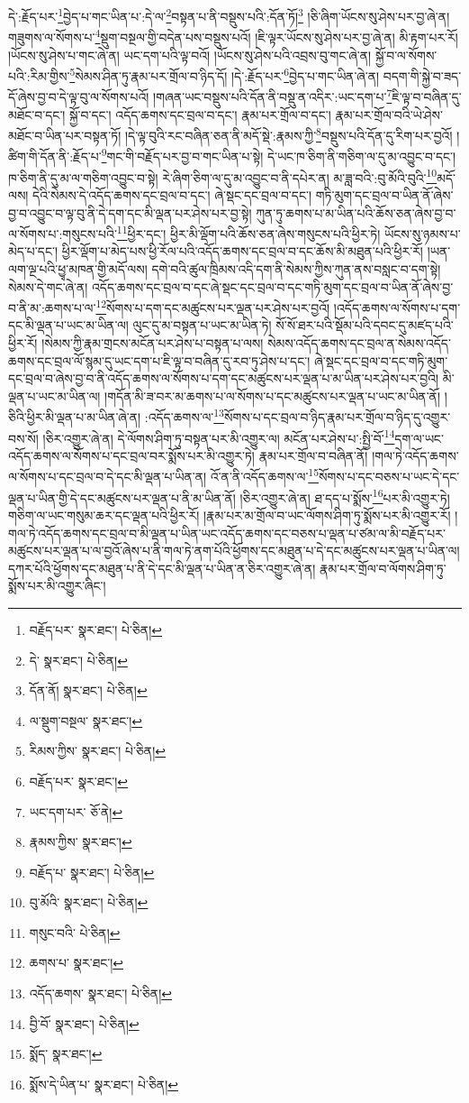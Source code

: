 དེ་:རྗོད་པར་\footnote{བརྗོད་པར་  སྣར་ཐང་།  པེ་ཅིན། }བྱེད་པ་གང་ཡིན་པ་:དེ་ལ་\footnote{དེ་  སྣར་ཐང་།  པེ་ཅིན། }བསྟན་པ་ནི་བསྡུས་པའི་:དོན་ཏོ།\footnote{དོན་ནོ།  སྣར་ཐང་།  པེ་ཅིན། } །ཅི་ཞིག་ཡོངས་སུ་ཤེས་པར་བྱ་ཞེ་ན། གཟུགས་ལ་སོགས་པ་\footnote{ལ་སྡུག་བསྔལ་  སྣར་ཐང་། }སྡུག་བསྔལ་གྱི་བདེན་པས་བསྡུས་པའོ། །ཇི་ལྟར་ཡོངས་སུ་ཤེས་པར་བྱ་ཞེ་ན། མི་རྟག་པར་རོ། །ཡོངས་སུ་ཤེས་པ་གང་ཞེ་ན། ཡང་དག་པའི་ལྟ་བའོ། །ཡོངས་སུ་ཤེས་པའི་འབྲས་བུ་གང་ཞེ་ན། སྐྱོ་བ་ལ་སོགས་པའི་:རིམ་གྱིས་\footnote{རིམས་ཀྱིས་  སྣར་ཐང་།  པེ་ཅིན། }སེམས་ཤིན་ཏུ་རྣམ་པར་གྲོལ་བ་ཉིད་དོ། །དེ་:རྗོད་པར་\footnote{བརྗོད་པར་  སྣར་ཐང་། }བྱེད་པ་གང་ཡིན་ཞེ་ན། བདག་གི་སྐྱེ་བ་ཟད་དོ་ཞེས་བྱ་བ་དེ་ལྟ་བུ་ལ་སོགས་པའོ། །གཞན་ཡང་བསྡུས་པའི་དོན་ནི་བསྡུ་ན་འདིར་:ཡང་དག་པ་\footnote{ཡང་དག་པར་  ཅོ་ནེ། }ཇི་ལྟ་བ་བཞིན་དུ་མཐོང་བ་དང་། སྐྱོ་བ་དང་། འདོད་ཆགས་དང་བྲལ་བ་དང་། རྣམ་པར་གྲོལ་བ་དང་། རྣམ་པར་གྲོལ་བའི་ཡེ་ཤེས་མཐོང་བ་ཡིན་པར་བསྟན་ཏོ། །དེ་ལྟ་བུའི་རང་བཞིན་ཅན་ནི་མདོ་སྡེ་:རྣམས་ཀྱི་\footnote{རྣམས་ཀྱིས་  སྣར་ཐང་། }བསྡུས་པའི་དོན་དུ་རིག་པར་བྱའོ། །ཚིག་གི་དོན་ནི་:རྗོད་པ་\footnote{བརྗོད་པ་  སྣར་ཐང་།  པེ་ཅིན། }གང་གི་བརྗོད་པར་བྱ་བ་གང་ཡིན་པ་སྟེ། དེ་ཡང་ཁ་ཅིག་ནི་གཅིག་ལ་དུ་མ་འབྱུང་བ་དང་། ཁ་ཅིག་ནི་དུ་མ་ལ་གཅིག་འབྱུང་བ་སྟེ། རེ་ཞིག་ཅིག་ལ་དུ་མ་འབྱུང་བ་ནི་དཔེར་ན། མ་ཟླ་བའི་:བུ་མོའི་བུའི་\footnote{བུ་མོའི་  སྣར་ཐང་།  པེ་ཅིན། }མདོ་ལས། དེའི་སེམས་དེ་འདོད་ཆགས་དང་བྲལ་བ་དང་། ཞེ་སྡང་དང་བྲལ་བ་དང་། གཏི་མུག་དང་བྲལ་བ་ཡིན་ནོ་ཞེས་བྱ་བ་འབྱུང་བ་ལྟ་བུ་ནི་དེ་དག་དང་མི་ལྡན་པར་ཤེས་པར་བྱ་སྟེ། ཀུན་ཏུ་ཆགས་པ་མ་ཡིན་པའི་ཆོས་ཅན་ཞེས་བྱ་བ་ལ་སོགས་པ་:གསུངས་པའི་\footnote{གསུང་བའི་  པེ་ཅིན། }ཕྱིར་དང་། ཕྱིར་མི་ལྡོག་པའི་ཆོས་ཅན་ཞེས་གསུངས་པའི་ཕྱིར་ཏེ། ཡོངས་སུ་ཉམས་པ་མེད་པ་དང་། ཕྱིར་ལྡོག་པ་མེད་པས་ཕྱི་རོལ་པའི་འདོད་ཆགས་དང་བྲལ་བ་དང་ཆོས་མི་མཐུན་པའི་ཕྱིར་རོ། །ཡན་ལག་ལྔ་པའི་ཕྱྭ་མཁན་གྱི་མདོ་ལས། དགེ་བའི་ཚུལ་ཁྲིམས་འདི་དག་ནི་སེམས་ཀྱིས་ཀུན་ནས་བསླང་བ་དག་སྟེ། སེམས་དེ་གང་ཞེ་ན། འདོད་ཆགས་དང་བྲལ་བ་དང་ཞེ་སྡང་དང་བྲལ་བ་དང་གཏི་མུག་དང་བྲལ་བ་ཡིན་ནོ་ཞེས་བྱ་བ་ནི་མ་:ཆགས་པ་ལ་\footnote{ཆགས་པ་  སྣར་ཐང་། }སོགས་པ་དག་དང་མཚུངས་པར་ལྡན་པར་ཤེས་པར་བྱའོ། །འདོད་ཆགས་ལ་སོགས་པ་དག་དང་མི་ལྡན་པ་ཡང་མ་ཡིན་ལ། ལུང་དུ་མ་བསྟན་པ་ཡང་མ་ཡིན་ཏེ། སོ་སོ་ཐར་པའི་སྡོམ་པའི་དབང་དུ་མཛད་པའི་ཕྱིར་རོ། །སེམས་ཀྱི་རྣམ་གྲངས་མངོན་པར་ཤེས་པ་བསྟན་པ་ལས། སེམས་འདོད་ཆགས་དང་བྲལ་ན་སེམས་འདོད་ཆགས་དང་བྲལ་ལོ་སྙམ་དུ་ཡང་དག་པ་ཇི་ལྟ་བ་བཞིན་དུ་རབ་ཏུ་ཤེས་པ་དང་། ཞེ་སྡང་དང་བྲལ་བ་དང་གཏི་མུག་དང་བྲལ་བ་ཞེས་བྱ་བ་ནི་འདོད་ཆགས་ལ་སོགས་པ་དག་དང་མཚུངས་པར་ལྡན་པ་མ་ཡིན་པར་ཤེས་པར་བྱའི། མི་ལྡན་པ་ཡང་མ་ཡིན་ལ། །གདོན་མི་ཟ་བར་མ་ཆགས་པ་ལ་སོགས་པ་དང་མཚུངས་པར་ལྡན་པ་ཡང་མ་ཡིན་ནོ། །ཅིའི་ཕྱིར་མི་ལྡན་པ་མ་ཡིན་ཞེ་ན། :འདོད་ཆགས་ལ་\footnote{འདོད་ཆགས་  སྣར་ཐང་།  པེ་ཅིན། }སོགས་པ་དང་བྲལ་བ་ཉིད་རྣམ་པར་གྲོལ་བ་ཉིད་དུ་འགྱུར་བས་སོ། །ཅིར་འགྱུར་ཞེ་ན། དེ་ལོགས་ཤིག་ཏུ་བསྟན་པར་མི་འགྱུར་ལ། མངོན་པར་ཤེས་པ་:སྤྱི་བོ་\footnote{བྱི་བོ་  སྣར་ཐང་།  པེ་ཅིན། }དག་ལ་ཡང་འདོད་ཆགས་ལ་སོགས་པ་དང་བྲལ་བར་སྨོས་པར་མི་འགྱུར་ཏེ། རྣམ་པར་གྲོལ་བ་བཞིན་ནོ། །གལ་ཏེ་འདོད་ཆགས་ལ་སོགས་པ་དང་བྲལ་བ་དེ་དང་མི་ལྡན་པ་ཡིན་ན། འོ་ན་ནི་འདོད་ཆགས་ལ་\footnote{སྨོད་  སྣར་ཐང་། }སོགས་པ་དང་བཅས་པ་ཡང་དེ་དང་ལྡན་པ་ཡིན་གྱི་དེ་དང་མཚུངས་པར་ལྡན་པ་ནི་མ་ཡིན་ནོ། །ཅིར་འགྱུར་ཞེ་ན། ཐ་དད་པ་སྨོས་\footnote{སྨོས་དེ་ཡིན་པ་  སྣར་ཐང་།  པེ་ཅིན། }པར་མི་འགྱུར་ཏེ། གཅིག་ལ་ཡང་གསུམ་ཆར་དང་ལྡན་པའི་ཕྱིར་རོ། །རྣམ་པར་མ་གྲོལ་བ་ཡང་ལོགས་ཤིག་ཏུ་སྨོས་པར་མི་འགྱུར་རོ། །གལ་ཏེ་འདོད་ཆགས་དང་བྲལ་བ་མི་ལྡན་པ་ཡིན་ཡང་འདོད་ཆགས་དང་བཅས་པ་ལྡན་པ་ཙམ་ལ་མི་བརྗོད་པར་མཚུངས་པར་ལྡན་པ་ལ་བྱའོ་ཞེས་པ་ནི་གལ་ཏེ་ནག་པོའི་ཕྱོགས་དང་མཐུན་པ་དེ་དང་མཚུངས་པར་ལྡན་པ་ཡིན་ལ། དཀར་པོའི་ཕྱོགས་དང་མཐུན་པ་ནི་དེ་དང་མི་ལྡན་པ་ཡིན་ན་ཅིར་འགྱུར་ཞེ་ན། རྣམ་པར་གྲོལ་བ་ལོགས་ཤིག་ཏུ་སྨོས་པར་མི་འགྱུར་ཞིང་། 